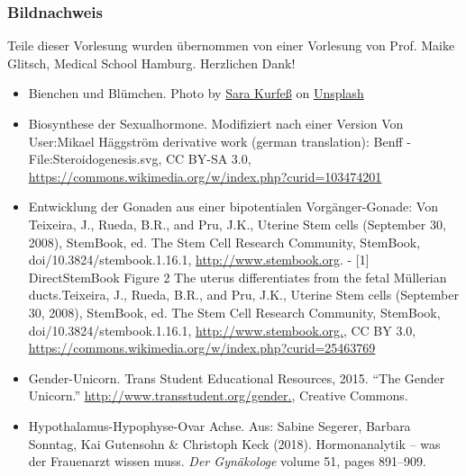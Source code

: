 \documentclass{beamer}
\begin{document}
\begin{frame}
\frametitle{Bildnachweis}

\begin{tiny}

Teile dieser Vorlesung wurden übernommen von einer Vorlesung von Prof. Maike Glitsch, Medical School Hamburg. Herzlichen Dank!


 
\begin{itemize}

   

\item
Bienchen und Blümchen. Photo by \href{https://unsplash.com/@stereophototyp?utm_source=unsplash&utm_medium=referral&utm_content=creditCopyText}{Sara Kurfeß} on \href{https://unsplash.com/s/photos/flowers-and-bees?utm_source=unsplash&utm_medium=referral&utm_content=creditCopyText}{Unsplash}

\item
Biosynthese der Sexualhormone. Modifiziert nach einer Version Von User:Mikael Häggström derivative work (german translation): Benff - File:Steroidogenesis.svg, CC BY-SA 3.0, \url{https://commons.wikimedia.org/w/index.php?curid=103474201}


\item

Entwicklung der Gonaden aus einer bipotentialen Vorgänger-Gonade: Von Teixeira, J., Rueda, B.R., and Pru, J.K., Uterine Stem cells (September 30, 2008), StemBook, ed. The Stem Cell Research Community, StemBook, doi/10.3824/stembook.1.16.1, \url{http://www.stembook.org}. - [1] DirectStemBook Figure 2 The uterus differentiates from the fetal Müllerian ducts.Teixeira, J., Rueda, B.R., and Pru, J.K., Uterine Stem cells (September 30, 2008), StemBook, ed. The Stem Cell Research Community, StemBook, doi/10.3824/stembook.1.16.1, \url{http://www.stembook.org.}, CC BY 3.0, \url{https://commons.wikimedia.org/w/index.php?curid=25463769}

\item
Gender-Unicorn. Trans Student Educational Resources, 2015. ``The Gender Unicorn.'' \url{http://www.transstudent.org/gender.}, Creative Commons.



\item
Hypothalamus-Hypophyse-Ovar Achse. Aus:    Sabine Segerer, Barbara Sonntag, Kai Gutensohn \& Christoph Keck (2018). Hormonanalytik – was der Frauenarzt wissen muss. \emph{Der Gynäkologe} volume 51, pages 891–909.


\end{itemize}
\end{tiny}
\end{frame}
\end{document}
